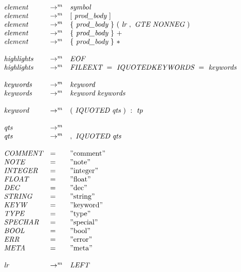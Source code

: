 \[
\begin{array}{lll}
\textit{element} & \to^m & \textit{symbol} \\
\textit{element} & \to^m & [\ \textit{prod\_body}\ ] \\
\textit{element} & \to^m & \{\ \textit{prod\_body}\ \}\ (\ \textit{lr}\  ,\ \textit{GTE}\  \textit{NONNEG}\  )\ \\
\textit{element} & \to^m & \{\ \textit{prod\_body}\ \}\ + \\
\textit{element} & \to^m & \{\ \textit{prod\_body}\ \}\ * \\ \\
\textit{highlights} & \to^m & \textit{EOF} \\
\textit{highlights} & \to^m & \textit{FILEEXT}\ =\ \textit{IQUOTED} \textit{KEYWORDS}\ =\ \textit{keywords} \\\\
\textit{keywords} & \to^m & \textit{keyword} \\
\textit{keywords} & \to^m & \textit{keyword}\ \textit{keywords} \\\\
\textit{keyword} & \to^m & (\ \textit{IQUOTED}\ \textit{qts}\ )\ :\ \textit{tp}\\\\
\textit{qts} & \to^m & \ \\
\textit{qts} & \to^m & ,\ \textit{IQUOTED}\ \textit{qts} \\\\
\textit{COMMENT} & = & "\textnormal{comment}" \\
\textit{NOTE} & = & "\textnormal{note}" \\
\textit{INTEGER} & = & "\textnormal{integer}" \\
\textit{FLOAT} & = & "\textnormal{float}" \\
\textit{DEC} & = & "\textnormal{dec}" \\
\textit{STRING} & = & "\textnormal{string}" \\
\textit{KEYW} & = & "\textnormal{keyword}" \\
\textit{TYPE} & = & "\textnormal{type}" \\
\textit{SPECHAR} & = & "\textnormal{special}" \\
\textit{BOOL} & = & "\textnormal{bool}" \\
\textit{ERR} & = & "\textnormal{error}" \\
\textit{META} & = & "\textnormal{meta}" \\\\
\textit{lr} & \to^m & \textit{LEFT} \\

\end{array}\]
